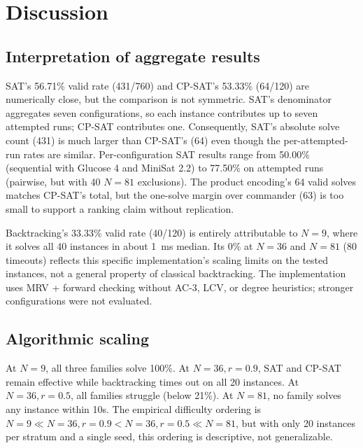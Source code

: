 \documentclass[a4paper,fleqn]{cas-sc}
\begin{document}

\section{Discussion}\label{sec:discussion}

\subsection{Interpretation of aggregate results}

SAT's 56.71\% valid rate (431/760) and CP-SAT's 53.33\% (64/120) are numerically close, but the comparison is not symmetric. SAT's denominator aggregates seven configurations, so each instance contributes up to seven attempted runs; CP-SAT contributes one. Consequently, SAT's absolute solve count (431) is much larger than CP-SAT's (64) even though the per-attempted-run rates are similar. Per-configuration SAT results range from 50.00\% (sequential with Glucose 4 and MiniSat 2.2) to 77.50\% on attempted runs (pairwise, but with 40 \(N=81\) exclusions). The product encoding's 64 valid solves matches CP-SAT's total, but the one-solve margin over commander (63) is too small to support a ranking claim without replication.

Backtracking's 33.33\% valid rate (40/120) is entirely attributable to \(N=9\), where it solves all 40 instances in about 1~ms median. Its 0\% at \(N=36\) and \(N=81\) (80 timeouts) reflects this specific implementation's scaling limits on the tested instances, not a general property of classical backtracking. The implementation uses MRV + forward checking without AC-3, LCV, or degree heuristics; stronger configurations were not evaluated.

\subsection{Algorithmic scaling}

At \(N=9\), all three families solve 100\%. At \(N=36, r=0.9\), SAT and CP-SAT remain effective while backtracking times out on all 20 instances. At \(N=36, r=0.5\), all families struggle (below 21\%). At \(N=81\), no family solves any instance within 10s. The empirical difficulty ordering is \(N=9 \ll N=36, r=0.9 < N=36, r=0.5 \ll N=81\), but with only 20 instances per stratum and a single seed, this ordering is descriptive, not generalizable.
\end{document}
